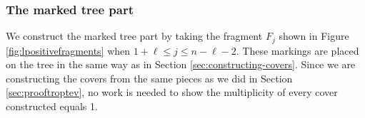 \documentclass[11pt,reqno]{amsart}
\theoremstyle{definition}
\begin{document}
\subsubsection*{The marked tree part}
We construct the marked tree part by taking the fragment $F_j$ shown in Figure \ref{fig:lpositivefragments} when $1+\ell\leq j \leq n-\ell-2$. These markings are placed on the tree in the same way as in Section \ref{sec:constructing-covers}. Since we are constructing the covers from the same pieces as we did in Section \ref{sec:prooftroptev}, no work is needed to show the multiplicity of every cover constructed equals 1. 

\begin{figure}[tb]
    \centering



\begin{tikzpicture}[x=0.65pt,y=0.65pt,yscale=-1,xscale=1]


\end{tikzpicture}
\end{figure}
\end{document}
